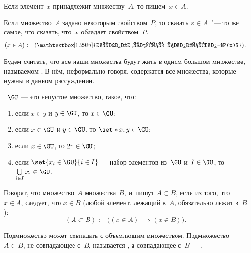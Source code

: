 Если элемент~$x$ принадлежит множеству~$A$, то пишем~$x \in A$.

Если множество~$A$ задано некоторым свойством~$P$, то сказать $x \in A$~"--- то
же самое, что сказать, что~$x$ обладает свойством~$P$:
\[
	\bigl(
		x \in A
	\bigr) :=
	\left(
		\mathtextbox[1.29in]{%
			выполняется свойство~$P(x)$%
		}%
	\right)
	.
\]

Будем считать, что все наши множества будут жить в одном большом множестве,
называемом . В нём, неформально говоря,
содержатся все множества, которые нужны в данном рассуждении.

\begin{definition}
	\label{def:Universum}
	~$\GU$ --- это непустое множество, такое, что:
	\begin{enumerate}[1)]
		\item если $x \in y$ и $y \in \GU$, то $x \in \GU$;
		\item если $x \in \GU$ и $y \in \GU$, то $\set*{x, y} \in \GU$;
		\item если $x \in \GU$, то $2^x \in \GU$;
		\item если $\set{x_i \in \GU}{i \in I}$ --- набор элементов из~$\GU$ и~$I
					\in \GU$, то
					$
						\bigcup\limits_{i \in I} x_i \in \GU
					$.
	\end{enumerate}
\end{definition}

\begin{definition}
	\label{def:subset}
	Говорят, что множество~$A$  множества~$B$,
	и~пишут $A \subset B$, если из того, что $x \in A$, следует, что $x \in B$
	(любой элемент, лежащий в~$A$, обязательно лежит в~$B$):
	\[
		(A \subset B) :=
		\bigl(
			(x \in A)
			\implies
			(x \in B)
		\bigr)
		.
	\]
\end{definition}

Подмножество может совпадать с объемлющим множеством. Подмножество~$A \subset B$, не совпадающее с~$B$, называется , а совпадающее с~$B$ --- .

